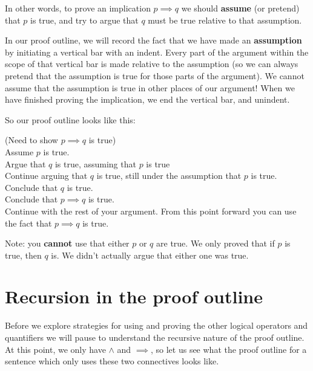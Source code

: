 In other words, to prove an implication $p \implies q$ we should \textbf{assume} (or pretend) that $p$ is true, and try to argue that $q$ must be true relative to that assumption.

In our proof outline, we will record the fact that we have made an \textbf{assumption} by initiating a vertical bar with an indent.  Every part of the argument within the scope of that vertical bar is made relative to the assumption (so we can always pretend that the assumption is true for those parts of the argument).  We cannot assume that the assumption is true in other places of our argument!  When we have finished proving the implication, we end the vertical bar, and unindent.

 
\newpage

So our proof outline looks like this:


	\begin{fitch*}
		\textrm{(Need to show $p \implies q$ is true)}\\
		\textrm{Assume $p$ is true.}\\
		\fa \textrm{ Argue that $q$ is true, assuming that $p$ is true}\\
		\fa \textrm{ Continue arguing that $q$ is true, still under the assumption that $p$ is true.}\\
		\fa \textrm{ Conclude that $q$ is true.}\\
		\textrm{Conclude that $p \implies q$ is true.}\\
		\textrm{Continue with the rest of your argument.  From this point forward you can use the fact that $p \implies q$ is true.}\\
	\end{fitch*}

Note:  you \textbf{cannot} use that either $p$ or $q$ are true.  We only proved that if $p$ is true, then $q$ is.  We didn't actually argue that either one was true.

\newpage

\section{Recursion in the proof outline}

Before we explore strategies for using and proving the other logical operators and quantifiers we will pause to understand the recursive nature of the proof outline.  At this point, we only have $\wedge$ and $\implies$, so let us see what the proof outline for a sentence which only uses these two connectives looks like.


